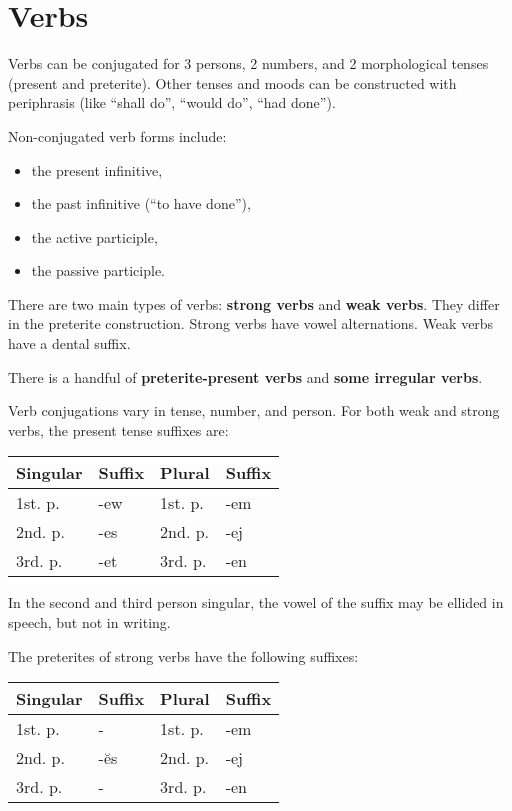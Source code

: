 \section{Verbs}

Verbs can be conjugated for 3 persons, 2 numbers, and 2 morphological tenses (present and preterite). Other tenses and moods can be constructed with periphrasis (like ``shall do'', ``would do'', ``had done'').

Non-conjugated verb forms include:

\begin{itemize}
\item the present infinitive,
\item the past infinitive (``to have done''),
\item the active participle,
\item the passive participle.
\end{itemize}

There are two main types of verbs: \textbf{strong verbs} and \textbf{weak verbs}. They differ in the preterite construction. Strong verbs have vowel alternations. Weak verbs have a dental suffix.

There is a handful of \textbf{preterite-present verbs} and \textbf{some irregular verbs}.

Verb conjugations vary in tense, number, and person. For both weak and strong verbs, the present tense suffixes are:

\begin{center}
\begin{tabular}{llll}
Singular & Suffix & Plural & Suffix \\
\hline
1st. p. & -ew & 1st. p. & -em \\
2nd. p. & -es & 2nd. p. & -ej \\
3rd. p. & -et & 3rd. p. & -en \\
\end{tabular}
\end{center}

In the second and third person singular, the vowel of the suffix may be ellided in speech, but not in writing.

The preterites of strong verbs have the following suffixes:

\begin{center}
\begin{tabular}{llll}
Singular & Suffix & Plural & Suffix \\
\hline
1st. p. & -   & 1st. p. & -em \\
2nd. p. & -ĕs & 2nd. p. & -ej \\
3rd. p. & -   & 3rd. p. & -en \\
\end{tabular}
\end{center}

